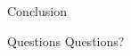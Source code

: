 \begin{frame}[label=conclusion]{Conclusion}
\end{frame}

\begin{frame}[label=questions]{Questions}\relax
    {\Huge Questions?}
\end{frame}
